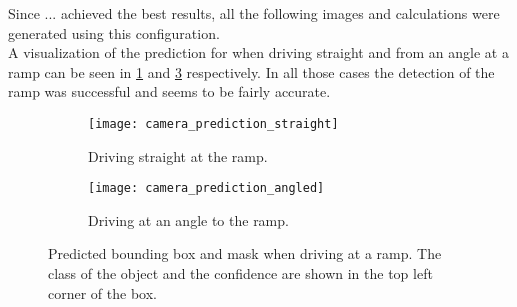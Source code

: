 Since ... achieved the best results, all the following images and calculations were generated using this configuration.\\
A visualization of the prediction for when driving straight and from an angle at a ramp can be seen in \cref{fig:camera_prediction_straight} and \cref{fig:camera_prediction_angled} respectively.
In all those cases the detection of the ramp was successful and seems to be fairly accurate.

\begin{figure}[htb]
	\centering
	\begin{subfigure}{1\textwidth}
		\centering
		\texttt{[image: camera\_prediction\_straight]}
		\caption{Driving straight at the ramp.}
		\label{fig:camera_prediction_straight}
	\end{subfigure}
	
	\begin{subfigure}{1\textwidth}
		\centering
		\texttt{[image: camera\_prediction\_angled]}
		\caption{Driving at an angle to the ramp.}
		\label{fig:camera_prediction_angled}
	\end{subfigure}
	\caption{Predicted bounding box and mask when driving at a ramp. The class of the object and the confidence are shown in the top left corner of the box.}
\end{figure}

